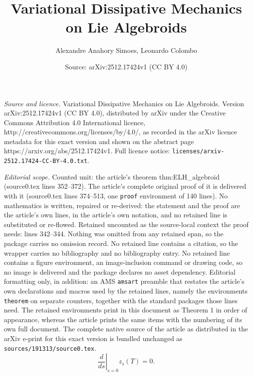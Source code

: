 \documentclass[10pt,a4paper]{amsart}
\title{Variational Dissipative Mechanics on Lie Algebroids}
\author{Alexandre Anahory Simoes, Leonardo Colombo}
\date{Source: arXiv:2512.17424v1 (CC BY 4.0)}
\begin{document}
\maketitle

\noindent\emph{Source and licence.} Variational Dissipative Mechanics on Lie Algebroids. Version arXiv:2512.17424v1 (CC BY 4.0), distributed by arXiv under the Creative Commons Attribution 4.0 International licence, http://creativecommons.org/licenses/by/4.0/, as recorded in the arXiv licence metadata for this exact version and shown on the abstract page https://arxiv.org/abs/2512.17424v1. Full licence notice: \texttt{licenses/arxiv-2512.17424-CC-BY-4.0.txt}.\par\smallskip

\noindent\textit{Editorial scope.} Counted unit: the article's theorem thm:ELH\_algebroid (source0.tex lines 352--372). The article's complete original proof of it is delivered with it (source0.tex lines 374--513, one \texttt{proof} environment of 140 lines). No mathematics is written, repaired or re-derived: the statement and the proof are the article's own lines, in the article's own notation, and no retained line is substituted or re-flowed.  Retained uncounted as the source-local context the proof needs: lines 342--344.  Nothing was omitted from any retained span, so the package carries no omission record.  No retained line contains a citation, so the wrapper carries no bibliography and no bibliography entry.  No retained line contains a figure environment, an image-inclusion command or drawing code, so no image is delivered and the package declares no asset dependency.  Editorial formatting only, in addition: an AMS \texttt{amsart} preamble that restates the article's own declarations and macros used by the retained lines, namely the environments \texttt{theorem} on separate counters, together with the standard packages those lines need.  The retained environments print in this document as Theorem 1 in order of appearance, whereas the article prints the same items with the numbering of its own full document.  The complete native source of the article as distributed in the arXiv e-print for this exact version is bundled unchanged as \texttt{sources/191313/source0.tex}.
\begin{equation}\label{eq:stationary}
\left.\frac{d}{ds}\right|_{s=0} z_s(T) = 0.
\end{equation}
\end{document}
